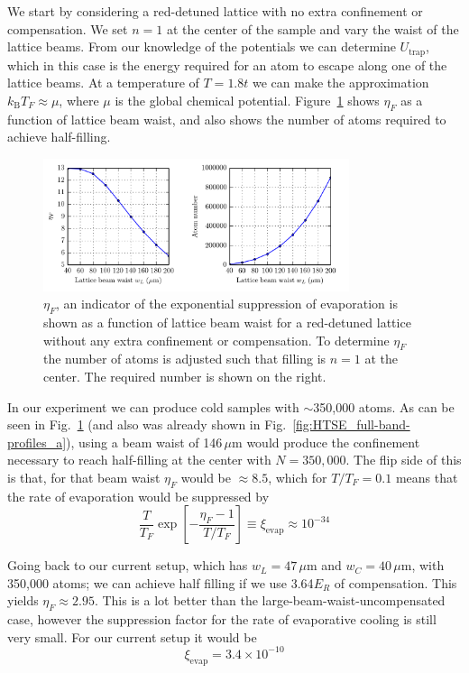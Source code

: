 \documentclass[11pt,letter]{article}
\newcommand{\kb}{\ensuremath{k_{\text{B}}}}
\begin{document}
We start by considering a red-detuned lattice with no extra confinement or
compensation.  We set  $n=1$ at the center of the sample and vary the waist of
the lattice beams.    From our knowledge of the potentials we can determine
$U_{\text{trap}}$, which in this case is the energy required for an atom to
escape along one of the lattice beams.   At a temperature of $T=1.8t$  we can
make the approximation $\kb T_{F} \approx \mu$, where $\mu$ is the global
chemical potential.  Figure~\ref{fig:etaF-no-comp_vary-wIR} shows $\eta_{F}$ as
a function of lattice beam waist, and also shows the number of atoms
required to achieve half-filling.   
\begin{figure}
    \centering
\includegraphics[width=0.8\textwidth]{figures/etaF-no-comp_vary-wIR.png}
\caption{$\eta_{F}$, an indicator of the exponential suppression of evaporation
is shown as a function of lattice beam waist for a red-detuned lattice without
any extra confinement or compensation. To determine $\eta_{F}$ the number of
atoms is adjusted such that filling is $n=1$ at the center.   The required
number is shown on the right.}\label{fig:etaF-no-comp_vary-wIR}
\end{figure}

In our experiment we can produce cold samples with $\sim$350,000 atoms.   As
can be seen in Fig.~\ref{fig:etaF-no-comp_vary-wIR} (and also was already shown
in Fig.~\ref{fig:HTSE_full-band-profiles_a}),  using a beam waist of
146\,$\mu$m would produce the confinement necessary to reach half-filling at
the center with $N=350,000$.  The flip side of this is that, for that beam
waist $\eta_{F}$ would be $\approx 8.5 $,  which for $T/T_{F}=0.1$ means that
the rate of evaporation would be suppressed by  
\begin{equation}
   \frac{T}{T_{F}}\exp\left[ - \frac{\eta_{F} - 1 }{T/T_{F} } 
 \right] \equiv \xi_{\text{evap}}\approx 10^{-34} 
\end{equation} 

Going back to our current setup, which has $w_{L}=47\,\mu$m and
$w_{C}=40\,\mu$m,  with 350,000 atoms; we can achieve half filling if we use
3.64$E_{R}$ of compensation.  This yields $\eta_{F} \approx 2.95$.  This is a
lot better than the large-beam-waist-uncompensated case, however the suppression
factor for the rate of evaporative cooling is still very small.  For our
current setup it would be
\begin{equation}
 \xi_{\text{evap}} = 3.4\times 10^{-10} 
\end{equation}
\end{document}
